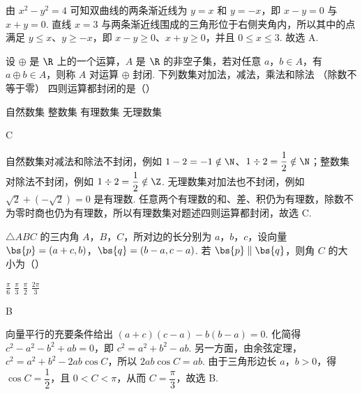 \begin{solution}
由 \(x^2-y^2=4\) 可知双曲线的两条渐近线为 \(y=x\) 和 \(y=-x\)，即 \(x-y=0\) 与 \(x+y=0\). 直线 \(x=3\) 与两条渐近线围成的三角形位于右侧夹角内，所以其中的点满足 \(y\leqslant x\)、\(y\geqslant-x\)，即 \(x-y\geqslant0\)、\(x+y\geqslant0\)，并且 \(0\leqslant x\leqslant3\). 故选 A.
\end{solution}

\begin{problem}
设 \(\oplus\) 是 \(\R\) 上的一个运算，\(A\) 是 \(\R\) 的非空子集，若对任意 \(a\)，\(b \in A\)，有 \(a \oplus b \in A\)，则称 \(A\) 对运算 \(\oplus\) 封闭. 下列数集对加法，减法，乘法和除法 （除数不等于零） 四则运算都封闭的是（\quad）

\choices
    {自然数集}
    {整数集}
    {有理数集}
    {无理数集}
\end{problem}

\begin{answer}
C
\end{answer}

\begin{solution}
自然数集对减法和除法不封闭，例如 \(1-2=-1\notin\N\)、\(1\div2=\dfrac12\notin\N\)；整数集对除法不封闭，例如 \(1\div2=\dfrac12\notin\Z\). 无理数集对加法也不封闭，例如 \(\sqrt2+(-\sqrt2)=0\) 是有理数. 任意两个有理数的和、差、积仍为有理数，除数不为零时商也仍为有理数，所以有理数集对题述四则运算都封闭，故选 C.
\end{solution}

\begin{problem}
\(\triangle ABC\) 的三内角 \(A\)，\(B\)，\(C\)，所对边的长分别为 \(a\)，\(b\)，\(c\)，设向量 \(\bs{p} = (a + c, b)\)，\(\bs{q} = (b - a, c - a)\). 若 \(\bs{p} \parallel \bs{q}\)，则角 \(C\) 的大小为（\quad）

\choices
    {\(\frac{\pi}{6}\)}
    {\(\frac{\pi}{3}\)}
    {\(\frac{\pi}{2}\)}
    {\(\frac{2\pi}{3}\)}
\end{problem}

\begin{answer}
B
\end{answer}

\begin{solution}
向量平行的充要条件给出 \((a+c)(c-a)-b(b-a)=0\). 化简得 \(c^2-a^2-b^2+ab=0\)，即 \(c^2=a^2+b^2-ab\). 另一方面，由余弦定理，\(c^2=a^2+b^2-2ab\cos C\)，所以 \(2ab\cos C=ab\). 由于三角形边长 \(a\)，\(b>0\)，得 \(\cos C=\dfrac12\)，且 \(0<C<\pi\)，从而 \(C=\dfrac{\pi}{3}\)，故选 B.
\end{solution}

